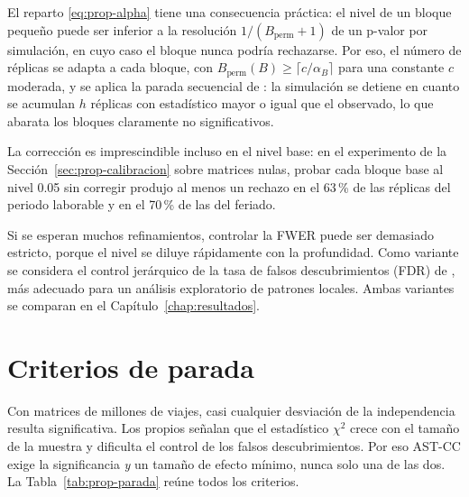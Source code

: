 El reparto \eqref{eq:prop-alpha} tiene una consecuencia práctica: el nivel de un
bloque pequeño puede ser inferior a la resolución $1/(B_{\mathrm{perm}}+1)$ de
un p-valor por simulación, en cuyo caso el bloque nunca podría rechazarse. Por
eso, el número de réplicas se adapta a cada bloque, con
$B_{\mathrm{perm}}(B)\ge \lceil c/\alpha_B\rceil$ para una constante $c$
moderada, y se aplica la parada secuencial de \cite{Besag1991}: la simulación
se detiene en cuanto se acumulan $h$ réplicas con estadístico mayor o igual que
el observado, lo que abarata los bloques claramente no significativos.

La corrección es imprescindible incluso en el nivel base: en el experimento de
la Sección~\ref{sec:prop-calibracion} sobre matrices nulas, probar cada bloque
base al nivel 0.05 sin corregir produjo al menos un rechazo en el 63\,\% de las
réplicas del periodo laborable y en el 70\,\% de las del feriado.

Si se esperan muchos refinamientos, controlar la FWER puede ser demasiado
estricto, porque el nivel se diluye rápidamente con la profundidad. Como
variante se considera el control jerárquico de la tasa de falsos
descubrimientos (FDR) de \cite{Yekutieli2008}, más adecuado para un análisis
exploratorio de patrones locales. Ambas variantes se comparan en el
Capítulo~\ref{chap:resultados}.

\section{Criterios de parada}\label{sec:prop-parada}

Con matrices de millones de viajes, casi cualquier desviación de la
independencia resulta significativa. Los propios \cite{Hu2025} señalan que el
estadístico $\chi^2$ crece con el tamaño de la muestra y dificulta el control de
los falsos descubrimientos. Por eso AST-CC exige la significancia \emph{y} un
tamaño de efecto mínimo, nunca solo una de las dos. La
Tabla~\ref{tab:prop-parada} reúne todos los criterios.

